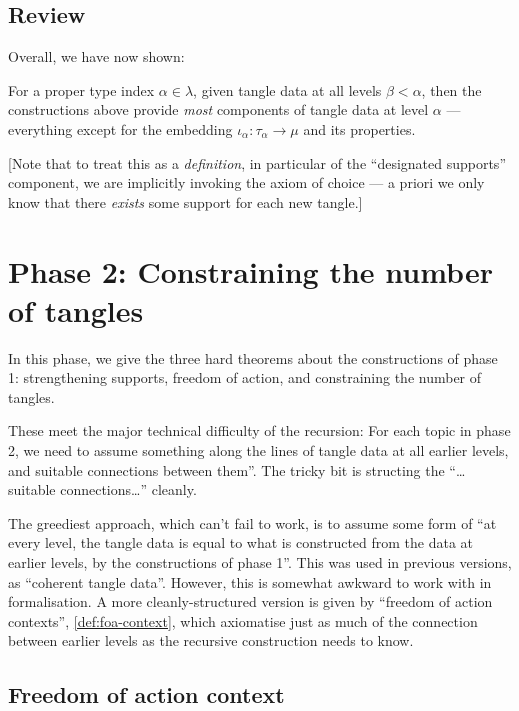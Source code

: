 \section{Review}

Overall, we have now shown:

\begin{definition}
  \label{def:tangle-data-propagates}
  For a proper type index $\alpha \in \lambda$, given tangle data at all levels $\beta < \alpha$, then the constructions above provide \emph{most} components of tangle data at level $\alpha$ — everything except for the embedding $\iota_\alpha : \tau_\alpha \to \mu$ and its properties.

  [Note that to treat this as a \emph{definition}, in particular of the “designated supports” component, we are implicitly invoking the axiom of choice --- a priori we only know that there \emph{exists} some support for each new tangle.]
\end{definition}

\newpage

\chapter{Phase 2: Constraining the number of tangles}

In this phase, we give the three hard theorems about the constructions of phase 1: strengthening supports, freedom of action, and constraining the number of tangles.

These meet the major technical difficulty of the recursion: For each topic in phase 2, we need to assume something along the lines of tangle data at all earlier levels, and suitable connections between them”.  The tricky bit is structing the “…suitable connections…” cleanly.

The greediest approach, which can’t fail to work, is to assume some form of “at every level, the tangle data is equal to what is constructed from the data at earlier levels, by the constructions of phase 1”.  This was used in previous versions, as “coherent tangle data”.  However, this is somewhat awkward to work with in formalisation.  A more cleanly-structured version is given by “freedom of action contexts”, \cref{def:foa-context}, which axiomatise just as much of the connection between earlier levels as the recursive construction needs to know.

\section{Freedom of action context}

